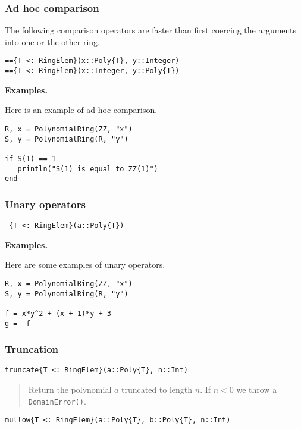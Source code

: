 \documentclass[a4paper,10pt]{article}
\newcommand{\code}{\lstinline}
\newcommand{\desc}[1]{\vspace{-3mm}\begin{quote}#1\end{quote}}
\begin{document}
\subsubsection{Ad hoc comparison}

The following comparison operators are faster than first coercing the arguments
into one or the other ring.

\begin{lstlisting}
=={T <: RingElem}(x::Poly{T}, y::Integer)
=={T <: RingElem}(x::Integer, y::Poly{T})
\end{lstlisting}

\textbf{Examples.}

Here is an example of ad hoc comparison.

\begin{lstlisting}
R, x = PolynomialRing(ZZ, "x")
S, y = PolynomialRing(R, "y")

if S(1) == 1
   println("S(1) is equal to ZZ(1)")
end
\end{lstlisting}

\subsubsection{Unary operators}

\begin{lstlisting}
-{T <: RingElem}(a::Poly{T})
\end{lstlisting}

\textbf{Examples.}

Here are some examples of unary operators.

\begin{lstlisting}
R, x = PolynomialRing(ZZ, "x")
S, y = PolynomialRing(R, "y")

f = x*y^2 + (x + 1)*y + 3
g = -f
\end{lstlisting}

\subsubsection{Truncation}

\begin{lstlisting}
truncate{T <: RingElem}(a::Poly{T}, n::Int)
\end{lstlisting}

\desc{Return the polynomial $a$ truncated to length $n$. If $n < 0$ we throw a
\code{DomainError()}.}

\begin{lstlisting}
mullow{T <: RingElem}(a::Poly{T}, b::Poly{T}, n::Int)
\end{lstlisting}
\end{document}
